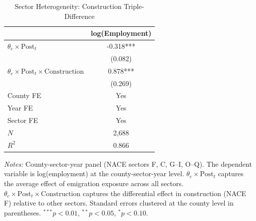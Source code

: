 \begin{table}[htbp]
\centering
\caption{Sector Heterogeneity: Construction Triple-Difference}
\label{tab:ddd}
\begin{tabular}{lc}
\toprule
 & log(Employment) \\
\midrule
$\theta_c \times \text{Post}_{t}$ & -0.318*** \\
 & (0.082) \\
\addlinespace
$\theta_c \times \text{Post}_{t} \times \text{Construction}$ & 0.878*** \\
 & (0.269) \\
\addlinespace
County FE & Yes \\
Year FE & Yes \\
Sector FE & Yes \\
$N$ & 2,688 \\
$R^2$ & 0.866 \\
\bottomrule
\end{tabular}
\begin{flushleft}\small
\textit{Notes:} County-sector-year panel (NACE sectors F, C, G--I, O--Q). The dependent variable is log(employment) at the county-sector-year level. $\theta_c \times \text{Post}_t$ captures the average effect of emigration exposure across all sectors. $\theta_c \times \text{Post}_t \times \text{Construction}$ captures the differential effect in construction (NACE F) relative to other sectors. Standard errors clustered at the county level in parentheses. $^{***}p<0.01$, $^{**}p<0.05$, $^{*}p<0.10$.
\end{flushleft}
\end{table}
